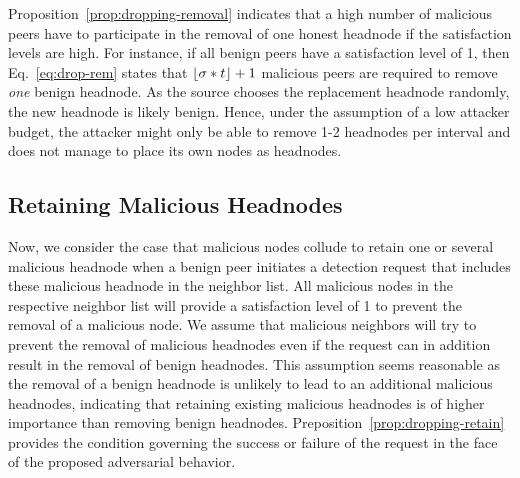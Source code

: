 Proposition~\ref{prop:dropping-removal} indicates that a high number of malicious peers have to participate in the removal of one honest headnode if the satisfaction levels are high. 
For instance, if all benign peers have a satisfaction level of 1, then Eq.~\ref{eq:drop-rem} states that $\lfloor \sigma*t \rfloor +1$ malicious peers are required to remove \emph{one} benign headnode.
As the source chooses the replacement headnode randomly, the new headnode is likely benign. 
Hence, under the assumption of a low attacker budget, the attacker might only be able to remove 1-2 headnodes per interval and does not manage to place its own nodes as headnodes. 

\subsection{Retaining Malicious Headnodes}
Now, we consider the case that malicious nodes collude to retain one or several malicious headnode when a benign peer initiates a detection request that includes these malicious headnode in the neighbor list. 
All malicious nodes in the respective neighbor list will provide a satisfaction level of 1 to prevent the removal of a malicious node. We assume that malicious neighbors will try to prevent the removal of malicious headnodes even if the request can in addition result in the removal of benign headnodes. This assumption seems reasonable as the removal of a benign headnode is unlikely to lead to an additional malicious headnodes, indicating that retaining existing malicious headnodes is of higher importance than removing benign headnodes.  Preposition~\ref{prop:dropping-retain} provides the condition governing the success or failure of the \drop request in the face of the proposed adversarial behavior. 

